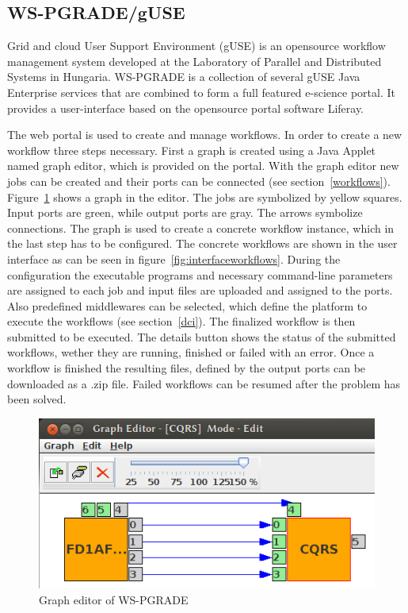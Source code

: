\subsection{WS-PGRADE/gUSE}\label{guse}

Grid and cloud User Support Environment (gUSE) is an opensource workflow management system developed at the Laboratory of Parallel and Distributed Systems in Hungaria.
WS-PGRADE is a collection of several gUSE Java Enterprise services that are combined to form a full featured e-science portal.
It provides a user-interface based on the opensource portal software Liferay.

The web portal is used to create and manage workflows. In order to create a new workflow three steps necessary. First a graph is created using a Java Applet named graph editor, which is provided on the portal. With the graph editor new jobs can be created and their ports can be connected (see section~\ref{workflows}). Figure~\ref{fig:grapheditor} shows a graph in the editor. The jobs are symbolized by yellow squares. Input ports are green, while output ports are gray. The arrows symbolize connections.
The graph is used to create a concrete workflow instance, which in the last step has to be configured.
The concrete workflows are shown in the user interface as can be seen in figure~\ref{fig:interfaceworkflows}.
During the configuration the executable programs and necessary command-line parameters are assigned to each job and input files are uploaded and assigned to the ports.
Also predefined middlewares can be selected, which define the platform to execute the workflows (see section~\ref{dci}).
The finalized workflow is then submitted to be executed.
The details button shows the status of the submitted workflows, wether they are running, finished or failed with an error.
Once a workflow is finished the resulting files, defined by the output ports can be downloaded as a .zip file.
Failed workflows can be resumed after the problem has been solved.


\begin{figure}%
                \centering
                \includegraphics[width=1.0\columnwidth]{images/graph-editor.png}
                \caption{Graph editor of WS-PGRADE}
                \label{fig:grapheditor}
\end{figure}


